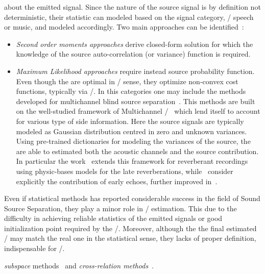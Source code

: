  about the emitted signal.
Since the nature of the source signal is by definition not deterministic, their statistic can modeled based on the signal category, \eg/ speech or music, and modeled accordingly.
Two main approaches can be identified~:
\begin{itemize}
    \item \textit{Second order moments approaches} derive closed-form solution for which the knowledge of the source auto-correlation (or variance) function is required.
    \item \textit{Maximum Likelihood approaches} require instead source probability function.
    Even though the are optimal in \ML/ sense, they optimize non-convex cost functions, typically via \EMdef/.
    In this categories one may include the methods developed for multichannel blind source separation~.
    This methods are built on the well-studied framework of Multichannel \NMF/~ which lend itself to account for various type of side information.
    Here the source signals are typically modeled as Gaussian distribution centred in zero and unknown variances.
    Using pre-trained dictionaries for modeling the variances of the source, the are able to estimated both the acoustic channels and the source contribution.
    In particular the work~ extends this framework for reverberant recordings using physic-bases models for the late reverberations, while~ consider explicitly the contribution of early echoes, further improved in~.
\end{itemize}
Even if statistical methods has reported considerable success in the field of Sound Source Separation, they play a minor role in \RIR/ estimation.
This due to the difficulty in achieving reliable statistics of the emitted signals or good initialization point required by the \EM/.
Moreover, although the the final estimated \RIRs/ may match the real one in the statistical sense, they lacks of proper definition, indispensable for \AER/.

 \textit{subspace} methods~ and \textit{cross-relation methods}~.

